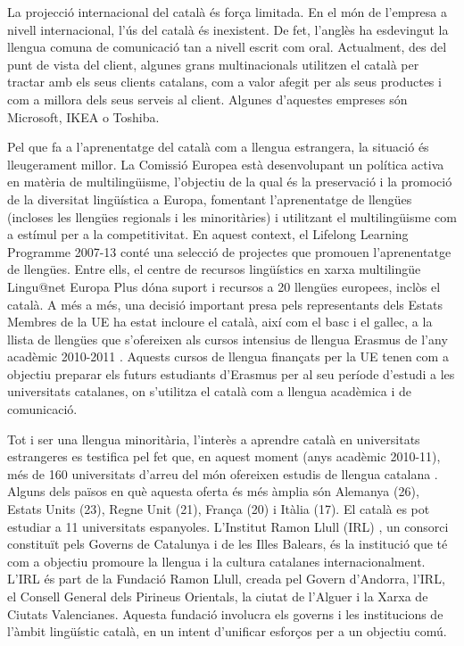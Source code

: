 \begin{multicols}{2}
La projecció internacional del català és força limitada. En el món de l’empresa a nivell internacional, l’ús del català és inexistent. De fet, l’anglès ha esdevingut la llengua comuna de comunicació tan a nivell escrit com oral. Actualment, des del punt de vista del client, algunes grans multinacionals utilitzen el català per tractar amb els seus clients catalans, com a valor afegit per als seus productes i com a millora dels seus serveis al client. Algunes d’aquestes empreses són Microsoft, IKEA o Toshiba.

Pel que fa a l’aprenentatge del català com a llengua estrangera, la situació és lleugerament millor. La Comissió Europea està desenvolupant un política activa en matèria de multilingüisme, l’objectiu de la qual és la preservació i la promoció de la diversitat lingüística a Europa, fomentant l’aprenentatge de llengües (incloses les llengües regionals i les minoritàries) i utilitzant el multilingüisme com a estímul per a la competitivitat. En aquest context, el Lifelong Learning Programme 2007-13 conté una selecció de projectes que promouen l’aprenentatge de llengües. Entre ells, el centre de recursos lingüístics en xarxa multilingüe Lingu@net Europa Plus \cite{CAT-Nota9} dóna suport i recursos a 20 llengües europees, inclòs el català. A més a més, una decisió important presa pels representants dels Estats Membres de la UE ha estat incloure el català, així com el basc i el gallec, a la llista de llengües que s’ofereixen als cursos intensius de llengua Erasmus de l’any acadèmic 2010-2011 \cite{CAT-Nota10}. Aquests cursos de llengua finançats per la UE tenen com a objectiu preparar els futurs estudiants d’Erasmus per al seu període d’estudi a les universitats catalanes, on s’utilitza el català com a llengua acadèmica i de comunicació.

Tot i ser una llengua minoritària, l’interès a aprendre català en universitats estrangeres es testifica pel fet que, en aquest moment (anys acadèmic 2010-11), més de 160 universitats d’arreu del món ofereixen estudis de llengua catalana \cite{CAT-Nota11}. Alguns dels països en què aquesta oferta és més àmplia són Alemanya (26), Estats Units (23), Regne Unit (21), França (20) i Itàlia (17). El català es pot estudiar a 11 universitats espanyoles. L’Institut Ramon Llull (IRL) \cite{CAT-Nota12}, un consorci constituït pels Governs de Catalunya i de les Illes Balears, és la institució que té com a objectiu promoure la llengua i la cultura catalanes internacionalment. L’IRL és part de la Fundació Ramon Llull, creada pel Govern d’Andorra, l’IRL, el Consell General dels Pirineus Orientals, la ciutat de l’Alguer i la Xarxa de Ciutats Valencianes. Aquesta fundació involucra els governs i les institucions de l’àmbit lingüístic català, en un intent d’unificar esforços per a un objectiu comú.


\end{multicols}
